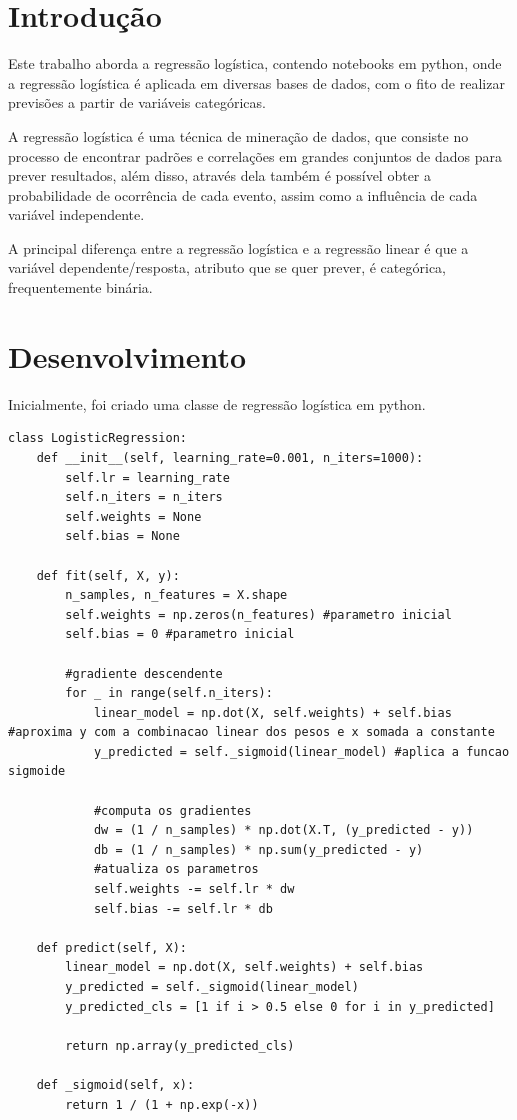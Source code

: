 \documentclass[12pt]{article}
\begin{document}
\thispagestyle{empty}

\newpage
\tableofcontents
\thispagestyle{empty}

\newpage
\section{Introdução}
\hspace{0.4cm} Este trabalho aborda a regressão logística, contendo notebooks em python, onde a regressão logística é aplicada em diversas bases de dados, com o fito de realizar previsões a partir de variáveis categóricas.

A regressão logística é uma técnica de mineração de dados, que consiste no processo de encontrar padrões e correlações em grandes conjuntos de dados para prever resultados, além disso, através dela também é possível obter a probabilidade de ocorrência de cada evento, assim como a influência de cada variável independente. 

A principal diferença entre a regressão logística e a regressão linear é que a variável dependente/resposta, atributo que se quer prever, é categórica, frequentemente binária. 

\newpage
\section{Desenvolvimento}
\hspace{0.4cm} Inicialmente, foi criado uma classe de regressão logística em python.
\\
\begin{lstlisting}
class LogisticRegression:
    def __init__(self, learning_rate=0.001, n_iters=1000):
        self.lr = learning_rate
        self.n_iters = n_iters
        self.weights = None
        self.bias = None

    def fit(self, X, y):
        n_samples, n_features = X.shape
        self.weights = np.zeros(n_features) #parametro inicial
        self.bias = 0 #parametro inicial

        #gradiente descendente
        for _ in range(self.n_iters):
            linear_model = np.dot(X, self.weights) + self.bias #aproxima y com a combinacao linear dos pesos e x somada a constante
            y_predicted = self._sigmoid(linear_model) #aplica a funcao sigmoide

            #computa os gradientes
            dw = (1 / n_samples) * np.dot(X.T, (y_predicted - y))
            db = (1 / n_samples) * np.sum(y_predicted - y)
            #atualiza os parametros
            self.weights -= self.lr * dw
            self.bias -= self.lr * db

    def predict(self, X):
        linear_model = np.dot(X, self.weights) + self.bias
        y_predicted = self._sigmoid(linear_model)
        y_predicted_cls = [1 if i > 0.5 else 0 for i in y_predicted]
        
        return np.array(y_predicted_cls)

    def _sigmoid(self, x):
        return 1 / (1 + np.exp(-x))
\end{lstlisting}
\end{document}
